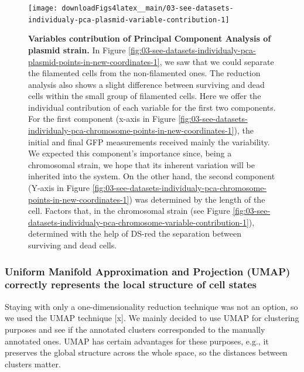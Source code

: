 \documentclass[a4paper, nobind]{templates/ociamthesis}
\begin{document}
\begin{figure}[H]
\texttt{[image: downloadFigs4latex\_\_main/03-see-datasets-individualy-pca-plasmid-variable-contribution-1]} \caption[Variables contribution of Principal Component Analysis of plasmid strain.]{\textbf{Variables contribution of Principal Component Analysis of plasmid strain.} In Figure \ref{fig:03-see-datasets-individualy-pca-plasmid-points-in-new-coordinates-1}, we saw that we could separate the filamented cells from the non-filamented ones. The reduction analysis also shows a slight difference between surviving and dead cells within the small group of filamented cells. Here we offer the individual contribution of each variable for the first two components. For the first component (x-axis in Figure \ref{fig:03-see-datasets-individualy-pca-chromosome-points-in-new-coordinates-1}), the initial and final GFP measurements received mainly the variability. We expected this component's importance since, being a chromosomal strain, we hope that its inherent variation will be inherited into the system. On the other hand, the second component (Y-axis in Figure \ref{fig:03-see-datasets-individualy-pca-chromosome-points-in-new-coordinates-1}) was determined by the length of the cell. Factors that, in the chromosomal strain (see Figure \ref{fig:03-see-datasets-individualy-pca-chromosome-variable-contribution-1}), determined with the help of DS-red the separation between surviving and dead cells.}\label{fig:03-see-datasets-individualy-pca-plasmid-variable-contribution-1}
\end{figure}

\hypertarget{uniform-manifold-approximation-and-projection-umap-correctly-represents-the-local-structure-of-cell-states}{%
\subsubsection{Uniform Manifold Approximation and Projection (UMAP) correctly represents the local structure of cell states}\label{uniform-manifold-approximation-and-projection-umap-correctly-represents-the-local-structure-of-cell-states}}

Staying with only a one-dimensionality reduction technique was not an option, so we used the UMAP technique {[}x{]}.
We mainly decided to use UMAP for clustering purposes and see if the annotated clusters corresponded to the manually annotated ones.
UMAP has certain advantages for these purposes, e.g., it preserves the global structure across the whole space, so the distances between clusters matter.
\end{document}
